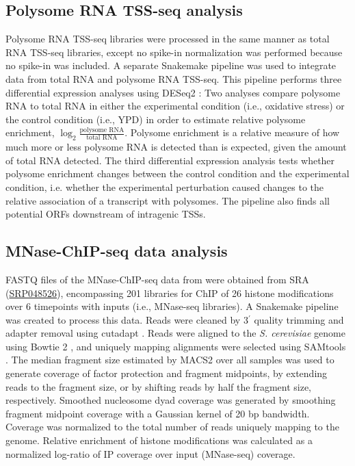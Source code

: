 \subsection{Polysome RNA TSS-seq analysis}

Polysome RNA TSS-seq libraries were processed in the same manner as total RNA TSS-seq libraries, except no spike-in normalization was performed because no spike-in was included.
A separate Snakemake pipeline was used to integrate data from total RNA and polysome RNA TSS-seq.
This pipeline performs three differential expression analyses using DESeq2 \citep{love2014}: Two analyses compare polysome RNA to total RNA in either the experimental condition (i.e., oxidative stress) or the control condition (i.e., YPD) in order to estimate relative polysome enrichment, $\log_2 \frac{\text{polysome RNA}}{\text{total RNA}}$.
Polysome enrichment is a relative measure of how much more or less polysome RNA is detected than is expected, given the amount of total RNA detected.
The third differential expression analysis tests whether polysome enrichment changes between the control condition and the experimental condition, i.e. whether the experimental perturbation caused changes to the relative association of a transcript with polysomes.
The pipeline also finds all potential ORFs downstream of intragenic TSSs.

\subsection{MNase-ChIP-seq data analysis}

FASTQ files of the MNase-ChIP-seq data from \citet{weiner2015} were obtained from SRA (\href{https://www.ncbi.nlm.nih.gov/sra?term=SRP048526}{SRP048526}), encompassing 201 libraries for ChIP of 26 histone modifications over 6 timepoints with inputs (i.e., MNase-seq libraries).
A Snakemake pipeline was created to process this data.
Reads were cleaned by 3$^\prime$ quality trimming and adapter removal using cutadapt \citep{martin2011}.
Reads were aligned to the \textit{S. cerevisiae} genome using Bowtie 2 \citep{langmead2012}, and uniquely mapping alignments were selected using SAMtools \citep{li2009}.
The median fragment size estimated by MACS2 \citep{zhang2008} over all samples was used to generate coverage of factor protection and fragment midpoints, by extending reads to the fragment size, or by shifting reads by half the fragment size, respectively.
Smoothed nucleosome dyad coverage was generated by smoothing fragment midpoint coverage with a Gaussian kernel of 20 bp bandwidth.
Coverage was normalized to the total number of reads uniquely mapping to the genome.
Relative enrichment of histone modifications was calculated as a normalized log-ratio of IP coverage over input (MNase-seq) coverage.

